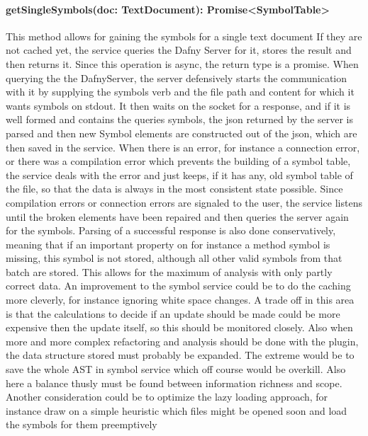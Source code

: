 \paragraph{getSingleSymbols(doc: TextDocument): Promise<SymbolTable>} This method allows for gaining the symbols for a single text document If they are not cached yet, the service queries the Dafny Server for it, stores the result and then returns it. Since this operation is async, the return type is a promise.
\newline
When querying the the DafnyServer, the server defensively starts the communication with it by supplying the symbols verb and the file path and content for which it wants symbols on stdout. It then waits on the socket for a response, and if it is well formed and contains the queries symbols, the json returned by the server is parsed and then new Symbol elements are constructed out of the json, which are then saved in the service. \newline
When there is an error, for instance a connection error, or there was a compilation error which prevents the building of a symbol table, the service deals with the error and just keeps, if it has any, old symbol table of the file, so that the data is always in the most consistent state possible. Since compilation errors or connection errors are signaled to the user, the service listens until the broken elements have been repaired and then queries the server again for the symbols. \newline
Parsing of a successful response is also done conservatively, meaning that if an important property on for instance a method symbol is missing, this symbol is not stored, although all other valid symbols from that batch are stored. This allows for the maximum of analysis with only partly correct data. \newline
An improvement to the symbol service could be to do the caching more cleverly, for instance ignoring white space changes. A trade off in this area is that the calculations to decide if an update should be made could be more expensive then the update itself, so this should be monitored closely. Also when more and more complex refactoring and analysis should be done with the plugin, the data structure stored must probably be expanded. The extreme would be to save the whole AST in symbol service which off course would be overkill. Also here a balance thusly must be found between information richness and scope. Another consideration could be to optimize the lazy loading approach, for instance draw on a simple heuristic which files might be opened soon and load the symbols for them preemptively\newline
